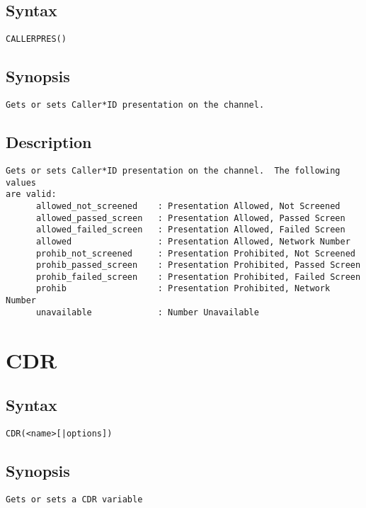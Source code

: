 \subsection{Syntax}
\begin{verbatim}
CALLERPRES()
\end{verbatim}
\subsection{Synopsis}
\begin{verbatim}
Gets or sets Caller*ID presentation on the channel.
\end{verbatim}
\subsection{Description}
\begin{verbatim}
Gets or sets Caller*ID presentation on the channel.  The following values
are valid:
      allowed_not_screened    : Presentation Allowed, Not Screened
      allowed_passed_screen   : Presentation Allowed, Passed Screen
      allowed_failed_screen   : Presentation Allowed, Failed Screen
      allowed                 : Presentation Allowed, Network Number
      prohib_not_screened     : Presentation Prohibited, Not Screened
      prohib_passed_screen    : Presentation Prohibited, Passed Screen
      prohib_failed_screen    : Presentation Prohibited, Failed Screen
      prohib                  : Presentation Prohibited, Network Number
      unavailable             : Number Unavailable

\end{verbatim}


\section{CDR}
\subsection{Syntax}
\begin{verbatim}
CDR(<name>[|options])
\end{verbatim}
\subsection{Synopsis}
\begin{verbatim}
Gets or sets a CDR variable
\end{verbatim}
